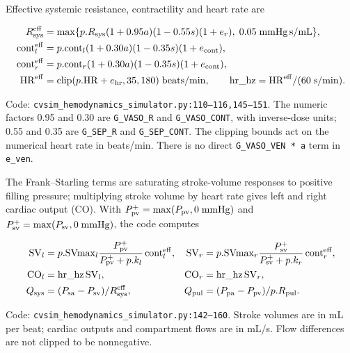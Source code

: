 Effective systemic resistance, contractility and heart rate are

\[
\begin{aligned}
R_{\rm sys}^{\rm eff}&=\max\{p.R_{\rm sys}(1+0.95a)(1-0.55s)(1+e_r),\;0.05\;\mathrm{mmHg\,s/mL}\},\\
\mathrm{cont}_{l}^{\rm eff}&=p.\mathrm{cont}_l(1+0.30a)(1-0.35s)(1+e_{\rm cont}),\\
\mathrm{cont}_{r}^{\rm eff}&=p.\mathrm{cont}_r(1+0.30a)(1-0.35s)(1+e_{\rm cont}),\\
\mathrm{HR}^{\rm eff}&=\operatorname{clip}(p.\mathrm{HR}+e_{\rm hr},35,180)\;\mathrm{beats/min},\qquad
\mathrm{hr\_hz}=\mathrm{HR}^{\rm eff}/(60\;\mathrm{s/min}).
\end{aligned}
\]


Code: \texttt{cvsim\_\allowbreak{}hemodynamics\_\allowbreak{}simulator.\allowbreak{}py:\allowbreak{}110–\allowbreak{}116,\allowbreak{}145–\allowbreak{}151}. The numeric factors 0.95 and 0.30 are \texttt{G\_\allowbreak{}VASO\_\allowbreak{}R} and \texttt{G\_\allowbreak{}VASO\_\allowbreak{}CONT}, with inverse-dose units; 0.55 and 0.35 are \texttt{G\_\allowbreak{}SEP\_\allowbreak{}R} and \texttt{G\_\allowbreak{}SEP\_\allowbreak{}CONT}. The clipping bounds act on the numerical heart rate in beats/min. There is no direct \texttt{G\_\allowbreak{}VASO\_\allowbreak{}VEN * a} term in \texttt{e\_\allowbreak{}ven}.

The Frank–Starling terms are saturating stroke-volume responses to positive filling pressure; multiplying stroke volume by heart rate gives left and right cardiac output (CO). With \(P_{\rm pv}^{+}=\max(P_{\rm pv},0\;\mathrm{mmHg})\) and \(P_{\rm sv}^{+}=\max(P_{\rm sv},0\;\mathrm{mmHg})\), the code computes

\[
\begin{aligned}
\mathrm{SV}_l&=p.\mathrm{SVmax}_l\frac{P_{\rm pv}^{+}}{P_{\rm pv}^{+}+p.k_l}\,\mathrm{cont}_l^{\rm eff},&
\mathrm{SV}_r&=p.\mathrm{SVmax}_r\frac{P_{\rm sv}^{+}}{P_{\rm sv}^{+}+p.k_r}\,\mathrm{cont}_r^{\rm eff},\\
\mathrm{CO}_l&=\mathrm{hr\_hz}\,\mathrm{SV}_l,&
\mathrm{CO}_r&=\mathrm{hr\_hz}\,\mathrm{SV}_r,\\
Q_{\rm sys}&=(P_{\rm sa}-P_{\rm sv})/R_{\rm sys}^{\rm eff},&
Q_{\rm pul}&=(P_{\rm pa}-P_{\rm pv})/p.R_{\rm pul}.
\end{aligned}
\]


Code: \texttt{cvsim\_\allowbreak{}hemodynamics\_\allowbreak{}simulator.\allowbreak{}py:\allowbreak{}142–\allowbreak{}160}. Stroke volumes are in mL per beat; cardiac outputs and compartment flows are in mL/s. Flow differences are not clipped to be nonnegative.

